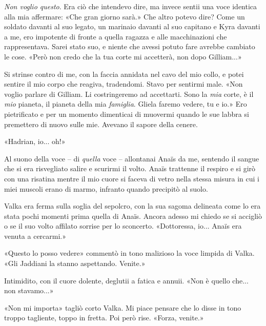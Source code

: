 \emph{Non voglio questo}. Era ciò che intendevo dire, ma invece sentii
una voce identica alla mia affermare: «Che gran giorno sarà.» Che altro
potevo dire? Come un soldato davanti al suo legato, un marinaio davanti
al suo capitano e Kyra davanti a me, ero impotente di fronte a quella
ragazza e alle macchinazioni che rappresentava. Sarei stato suo, e
niente che avessi potuto fare avrebbe cambiato le cose. «Però non credo
che la tua corte mi accetterà, non dopo Gilliam...»

Si strinse contro di me, con la faccia annidata nel cavo del mio collo,
e potei sentire il mio corpo che reagiva, tradendomi. Stavo per sentirmi
male. «Non voglio parlare di Gilliam. Li costringeremo ad accettarti.
Sono la \emph{mia} corte, è il \emph{mio} pianeta, il pianeta della mia
\emph{famiglia}. Gliela faremo vedere, tu e io.» Ero pietrificato e per
un momento dimenticai di muovermi quando le sue labbra si premettero di
nuovo sulle mie. Avevano il sapore della cenere.

«Hadrian, io... oh!»

Al suono della voce -- di \emph{quella} voce -- allontanai Anaïs da me,
sentendo il sangue che si era risvegliato salire e scurirmi il volto.
Anaïs trattenne il respiro e si girò con una risatina mentre il mio
cuore si faceva di vetro nella stessa misura in cui i miei muscoli erano
di marmo, infranto quando precipitò al suolo.

Valka era ferma sulla soglia del sepolcro, con la sua sagoma delineata
come lo era stata pochi momenti prima quella di Anaïs. Ancora adesso mi
chiedo se si accigliò o se il suo volto affilato sorrise per lo
sconcerto. «Dottoressa, io... Anaïs era venuta a cercarmi.»

«Questo lo posso vedere» commentò in tono malizioso la voce limpida di
Valka. «Gli Jaddiani la stanno aspettando. Venite.»

Intimidito, con il cuore dolente, deglutii a fatica e annuii. «Non è
quello che... non stavamo...»

«Non mi importa» tagliò corto Valka. Mi piace pensare che lo disse in
tono troppo tagliente, toppo in fretta. Poi però rise. «Forza, venite.»


